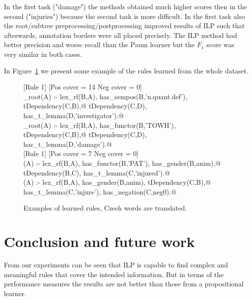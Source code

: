 \documentclass[runningheads,a4paper]{llncs}
\begin{document}
In the first task ("damage") the methods obtained much higher scores then in the second ("injuries") because the second task is more difficult. In the first task also the root/subtree preprocessing/postprocessing improved results of ILP such that afterwards, annotation borders were all placed precisely. The ILP method had better precision and worse recall than the Paum learner but the $F_1$ score was very similar in both cases.


In Figure~\ref{fig:rules} we present some example of the rules learned from the whole dataset.

\begin{figure}
	\scriptsize
[Rule 1] [Pos cover = 14 Neg cover = 0]\\
\verb@damage_root(A) :- lex_rf(B,A), has_sempos(B,'n.quant.def'), tDependency(C,B),@
\verb@   tDependency(C,D), has_t_lemma(D,'investigator').@ %
\smallskip\newline
[Rule 2] [Pos cover = 13 Neg cover = 0]\\
\verb@damage_root(A) :- lex_rf(B,A), has_functor(B,'TOWH'), tDependency(C,B),@
\verb@   tDependency(C,D), has_t_lemma(D,'damage').@\\


[Rule 1] [Pos cover = 7 Neg cover = 0]\\
\verb@injuries(A) :- lex_rf(B,A), has_functor(B,'PAT'), has_gender(B,anim),@
\verb@   tDependency(B,C), has_t_lemma(C,'injured').@
\smallskip\newline
[Rule 8] [Pos cover = 6 Neg cover = 0]\\
\verb@injuries(A) :- lex_rf(B,A), has_gender(B,anim), tDependency(C,B),@
\verb@   has_t_lemma(C,'injure'), has_negation(C,neg0).@
	\caption{Examples of learned rules, Czech words are translated.}
	\label{fig:rules}
\end{figure}















\section{Conclusion and future work}
From our experiments can be seen that ILP is capable to find complex and meaningful rules that cover the intended information. But in terms of the performance measures the results are not better than those from a propositional learner.
\end{document}
